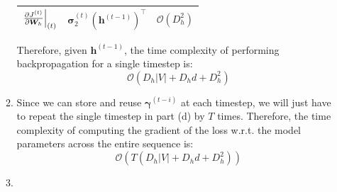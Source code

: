 \documentclass[10pt,reqno]{amsart}
\begin{document}
\begin{enumerate}[topsep=0pt,itemsep=3ex,partopsep=1ex,parsep=1ex]
\begin{enumerate}[itemsep=2ex]
\begin{center}
\begin{tabular}{|c|c|c|}
        $\left. \frac{\partial J^{(t)}}{\partial \bm{W}_h} \right\rvert_{(t)}$ & $\bm{\sigma}^{(t)}_2 \left(\bm{h}^{(t-1)}\right)^\top$ & $\mathcal{O}(D_h^2)$ \\
        \hline
      \end{tabular}
    \end{center}
    \vspace{1mm}
    Therefore, given $\bm{h}^{(t-1)}$, the time complexity of performing backpropagation
    for a single timestep is:
    \begin{equation*}
      \mathcal{O}(D_h |V| + D_h d + D_h^2)
    \end{equation*}
  \item Since we can store and reuse $\bm{\gamma}^{(t-i)}$ at each timestep, 
    we will just have to repeat the single timestep in part (d) by $T$ times. 
    Therefore, the time complexity of computing
    the gradient of the loss w.r.t. the model parameters across 
    the entire sequence is:
    \begin{equation*}
      \mathcal{O}(T(D_h |V| + D_h d + D_h^2))
    \end{equation*}
  \item 
  \end{enumerate}


\end{enumerate}
\end{document}
